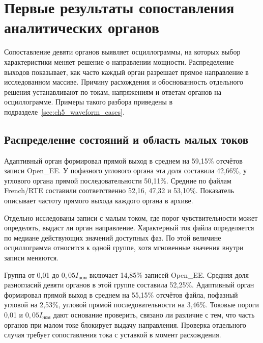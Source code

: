 \section{Первые результаты сопоставления аналитических органов}
\label{sec:ch5_first_results}

Сопоставление девяти органов выявляет осциллограммы, на которых выбор характеристики
меняет решение о направлении мощности. Распределение выходов показывает, как часто
каждый орган разрешает прямое направление в исследованном массиве. Причину расхождения и
обоснованность отдельного решения устанавливают по токам, напряжениям и ответам органов
на осциллограмме. Примеры такого разбора приведены в
подразделе~\ref{sec:ch5_waveform_cases}.

\subsection{Распределение состояний и область малых токов}

{}

Адаптивный орган формировал прямой выход в среднем на 59,15\% отсчётов записи Open\_EE. У пофазного углового органа эта доля составила 42,66\%, у углового органа прямой последовательности 50,11\%. Средние по файлам French/RTE составили соответственно 52,16, 47,32 и 53,10\%. Показатель описывает частоту прямого выхода каждого органа в архиве.

Отдельно исследованы записи с малым током, где порог чувствительности может определять,
выдаст ли орган направление. Характерный ток файла определяется по медиане действующих
значений доступных фаз. По этой величине осциллограмма относится к одной группе, хотя
мгновенные значения внутри записи меняются.

Группа от 0,01 до $0{,}05I_{\text{ном}}$ включает 14,85\% записей Open\_EE. Средняя доля разногласий девяти органов в этой группе составила 52,25\%. Адаптивный орган формировал прямой выход в среднем на 55,15\% отсчётов файла, пофазный угловой на 2,53\%, угловой прямой последовательности на 3,46\%. Токовые пороги 0,01 и $0{,}05I_{\text{ном}}$ дают основание проверить, связано ли различие с тем, что часть органов при малом токе блокирует выдачу направления. Проверка отдельного случая требует сопоставления тока с уставкой в момент расхождения.

